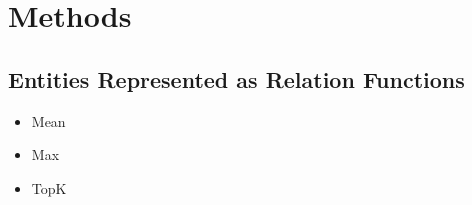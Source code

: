 \section{Methods \label{sec:methods}}

\subsection {Entities Represented as Relation Functions}
\begin{itemize}
  \item Mean
  \item Max
  \item TopK
\end{itemize}